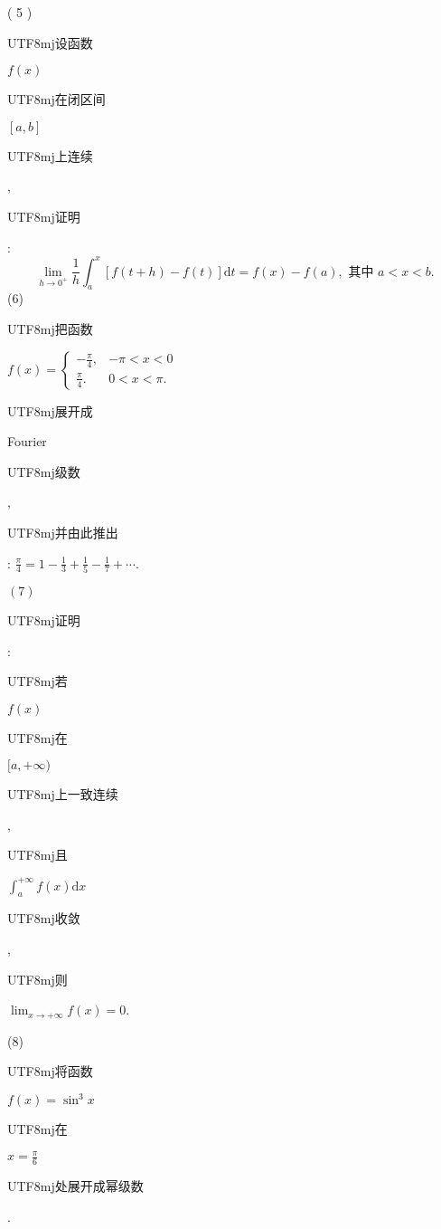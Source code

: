 \documentclass[10pt]{article}
\begin{document}
( 5 ) \begin{CJK}{UTF8}{mj}设函数\end{CJK} $f(x)$ \begin{CJK}{UTF8}{mj}在闭区间\end{CJK} $[a, b]$ \begin{CJK}{UTF8}{mj}上连续\end{CJK}, \begin{CJK}{UTF8}{mj}证明\end{CJK}:
$$
\lim _{h \rightarrow 0^{+}} \frac{1}{h} \int_{a}^{x}[f(t+h)-f(t)] \mathrm{d} t=f(x)-f(a), \text { 其中 } a<x<b .
$$
(6) \begin{CJK}{UTF8}{mj}把函数\end{CJK} $f(x)=\left\{\begin{array}{ll}-\frac{\pi}{4}, & -\pi<x<0 \\ \frac{\pi}{4} . & 0<x<\pi .\end{array}\right.$ \begin{CJK}{UTF8}{mj}展开成\end{CJK} Fourier \begin{CJK}{UTF8}{mj}级数\end{CJK}, \begin{CJK}{UTF8}{mj}并由此推出\end{CJK}: $\frac{\pi}{4}=1-\frac{1}{3}+\frac{1}{5}-\frac{1}{7}+\cdots .$

$(7)$ \begin{CJK}{UTF8}{mj}证明\end{CJK}: \begin{CJK}{UTF8}{mj}若\end{CJK} $f(x)$ \begin{CJK}{UTF8}{mj}在\end{CJK} $[a,+\infty)$ \begin{CJK}{UTF8}{mj}上一致连续\end{CJK}, \begin{CJK}{UTF8}{mj}且\end{CJK} $\int_{a}^{+\infty} f(x) \mathrm{d} x$ \begin{CJK}{UTF8}{mj}收敛\end{CJK}, \begin{CJK}{UTF8}{mj}则\end{CJK} $\lim _{x \rightarrow+\infty} f(x)=0$.

(8) \begin{CJK}{UTF8}{mj}将函数\end{CJK} $f(x)=\sin ^{3} x$ \begin{CJK}{UTF8}{mj}在\end{CJK} $x=\frac{\pi}{6}$ \begin{CJK}{UTF8}{mj}处展开成幂级数\end{CJK}.
\end{document}

